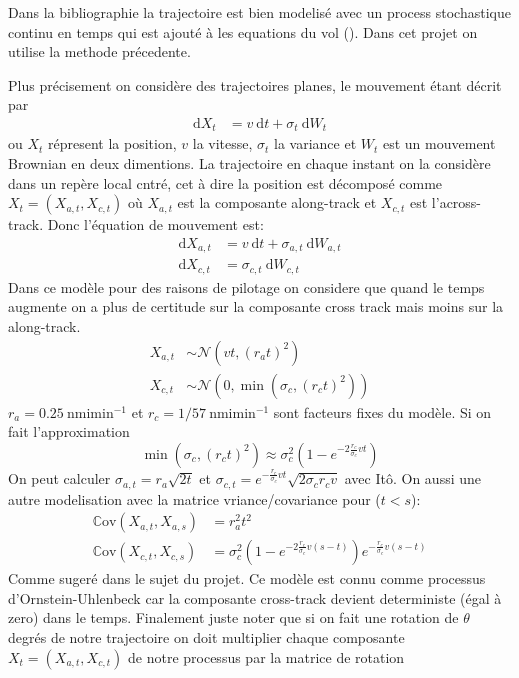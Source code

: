 \documentclass[a4paper, 12pt,twoside]{article}
\numberwithin{equation}{subsection}
\begin{document}
	Dans la bibliographie la trajectoire est bien modelisé avec un process stochastique continu en temps qui est ajouté à les equations du vol (\cite{prandini2005probabilistic}). Dans cet projet on utilise la methode précedente.
	
	Plus précisement on considère des trajectoires planes, le mouvement étant décrit par 
		\begin{align}
			\mathrm d X_t &= v ~ \mathrm d t+\sigma_t ~ \mathrm d W_t
		\end{align}
ou $X_t$ répresent la position, $v$ la vitesse, $\sigma_t$ la variance et $W_t$ est un mouvement Brownian en deux dimentions. La trajectoire en chaque instant on la considère dans un repère local cntré, cet à dire la position est décomposé comme $X_t=(X_{a,t},X_{c,t})$ où $X_{a,t}$ est la composante along-track et $X_{c,t}$ est l'across-track. Donc l'équation de mouvement est:
		\begin{align}
			\mathrm d X_{a,t} &= v ~ \mathrm d t+\sigma_{a,t} ~ \mathrm d W_{a,t} \\
			\mathrm d X_{c,t} &= \sigma_{c,t} ~ \mathrm d W_{c,t}
		\end{align}
Dans ce modèle pour des raisons de pilotage on considere que quand le temps augmente on a plus de certitude sur la composante cross track mais moins sur la along-track.
\begin{align}
	X_{a,t} &\sim \mathcal{N}(vt,(r_a t)^2) \\
	X_{c,t} &\sim \mathcal{N}(0,\min(\sigma_c, (r_c t)^2))
\end{align}
	$r_a=0.25~ \mathrm{nmi min^{-1}}$ et $r_c=1/57~ \mathrm{nmi min^{-1}}$ sont facteurs fixes du modèle. Si on fait l'approximation 
	$$\min(\sigma_c, (r_c t)^2) \approx \sigma_c^2 (1-e^{-2\frac{r_c}{\sigma_c}vt}) $$
	On peut calculer $\sigma_{a,t}=r_a\sqrt{2t}$ et $\sigma_{c,t}=e^{-\frac{r_c}{\sigma_c}vt}\sqrt{2\sigma_c r_c v}$ avec Itô. On aussi une autre modelisation avec la matrice vriance/covariance pour ($t<s$):
	\begin{align}
		\mathbb{C}\mathrm{ov}(X_{a,t},X_{a,s}) &= r_a^2 t^2 \\
		\mathbb{C}\mathrm{ov}(X_{c,t},X_{c,s}) &= \sigma_{c}^2 (1-e^{-2\frac{r_c}{\sigma_c}v(s-t)})e^{-\frac{r_c}{\sigma_c}v(s-t)}
	\end{align}
	Comme sugeré dans le sujet du projet. Ce modèle est connu comme processus d'Ornstein-Uhlenbeck car la composante cross-track devient deterministe (égal à zero) dans le temps.
	Finalement juste noter que si on fait une rotation de $\theta$ degrés de notre trajectoire on doit multiplier chaque composante $X_t=(X_{a,t},X_{c,t})$ de notre processus par la matrice de rotation 
\end{document}

